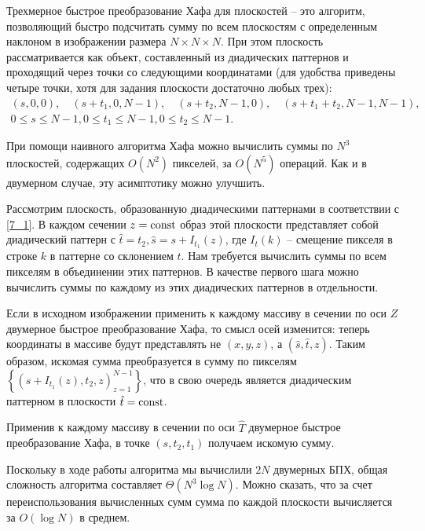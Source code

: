 
Трехмерное быстрое преобразование Хафа для плоскостей -- это алгоритм, позволяющий быстро подсчитать сумму по всем плоскостям с определенным наклоном в изображении размера $N \times N \times N$. При этом плоскость рассматривается как объект, составленный из диадических паттернов и проходящий через точки со следующими координатами (для удобства приведены четыре точки, хотя для задания плоскости достаточно любых трех):
\begin{gather}
\label{7_1}
    (s, 0, 0), \quad
    (s + t_1, 0, N-1), \quad
    (s + t_2, N-1, 0), \quad
    (s + t_1 + t_2, N-1, N-1), \\
\nonumber
    0 \le s \le N-1,
    0 \le t_1 \le N-1,
    0 \le t_2 \le N-1.
\end{gather}

При помощи наивного алгоритма Хафа можно вычислить суммы по $N^3$ плоскостей, содержащих $O(N^2)$ пикселей, за $O(N^5)$ операций. Как и в двумерном случае, эту асимптотику можно улучшить.

Рассмотрим плоскость, образованную диадическими паттернами в соответствии с \eqref{7_1}. В каждом сечении $z = \mathrm{const}$ образ этой плоскости представляет собой диадический паттерн с $\hat{t} = t_2, \hat{s} = s + I_{t_1}(z)$, где $I_{t}(k)$ -- смещение пикселя в строке $k$ в паттерне со склонением $t$. Нам требуется вычислить суммы по всем пикселям в объединении этих паттернов. В качестве первого шага можно вычислить суммы по каждому из этих диадических паттернов в отдельности.

Если в исходном изображении применить к каждому массиву в сечении по оси $Z$ двумерное быстрое преобразование Хафа, то смысл осей изменится: теперь координаты в массиве будут представлять не $(x, y, z)$, а $(\hat{s}, \hat{t}, z)$. Таким образом, искомая сумма преобразуется в сумму по пикселям $\left\{ \left( s + I_{t_1}(z), t_2, z \right)_{z=1}^{N-1} \right\}$, что в свою очередь является диадическим паттерном в плоскости $\hat{t} = \mathrm{const}$.

Применив к каждому массиву в сечении по оси $\hat{T}$ двумерное быстрое преобразование Хафа, в точке $\left( s, t_2, t_1 \right)$ получаем искомую сумму.

Поскольку в ходе работы алгоритма мы вычислили $2N$ двумерных БПХ, общая сложность алгоритма составляет $\Theta\left( N^3 \log N \right)$. Можно сказать, что за счет переиспользования вычисленных сумм сумма по каждой плоскости вычисляется за $O(\log N)$ в среднем.
